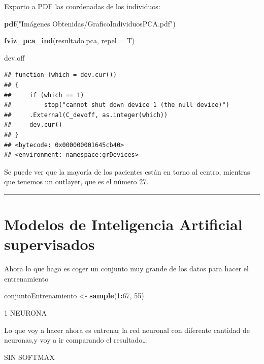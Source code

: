 \documentclass[]{article}
\newenvironment{Shaded}{\begin{snugshade}}{\end{snugshade}}
\newcommand{\DataTypeTok}[1]{\textcolor[rgb]{0.13,0.29,0.53}{#1}}
\newcommand{\DecValTok}[1]{\textcolor[rgb]{0.00,0.00,0.81}{#1}}
\newcommand{\KeywordTok}[1]{\textcolor[rgb]{0.13,0.29,0.53}{\textbf{#1}}}
\newcommand{\NormalTok}[1]{#1}
\newcommand{\OperatorTok}[1]{\textcolor[rgb]{0.81,0.36,0.00}{\textbf{#1}}}
\newcommand{\StringTok}[1]{\textcolor[rgb]{0.31,0.60,0.02}{#1}}
\begin{document}
Exporto a PDF las coordenadas de los individuos:

\begin{Shaded}
\begin{Highlighting}[]
\KeywordTok{pdf}\NormalTok{(}\StringTok{"Imágenes Obtenidas/GraficoIndividuosPCA.pdf"}\NormalTok{)}

\KeywordTok{fviz_pca_ind}\NormalTok{(resultado.pca, }\DataTypeTok{repel =}\NormalTok{ T)}

\NormalTok{dev.off}
\end{Highlighting}
\end{Shaded}

\begin{verbatim}
## function (which = dev.cur()) 
## {
##     if (which == 1) 
##         stop("cannot shut down device 1 (the null device)")
##     .External(C_devoff, as.integer(which))
##     dev.cur()
## }
## <bytecode: 0x000000001645cb40>
## <environment: namespace:grDevices>
\end{verbatim}

Se puede ver que la mayoría de los pacientes están en torno al centro,
mientras que tenemos un outlayer, que es el número 27.

\begin{center}\rule{0.5\linewidth}{\linethickness}\end{center}

\hypertarget{modelos-de-inteligencia-artificial-supervisados}{%
\section{Modelos de Inteligencia Artificial
supervisados}\label{modelos-de-inteligencia-artificial-supervisados}}

Ahora lo que hago es coger un conjunto muy grande de los datos para
hacer el entrenamiento

\begin{Shaded}
\begin{Highlighting}[]
\NormalTok{conjuntoEntrenamiento <-}\StringTok{ }\KeywordTok{sample}\NormalTok{(}\DecValTok{1}\OperatorTok{:}\DecValTok{67}\NormalTok{, }\DecValTok{55}\NormalTok{)}
\end{Highlighting}
\end{Shaded}

1 NEURONA

Lo que voy a hacer ahora es entrenar la red neuronal con diferente
cantidad de neuronas,y voy a ir comparando el resultado\ldots{}

SIN SOFTMAX
\end{document}
